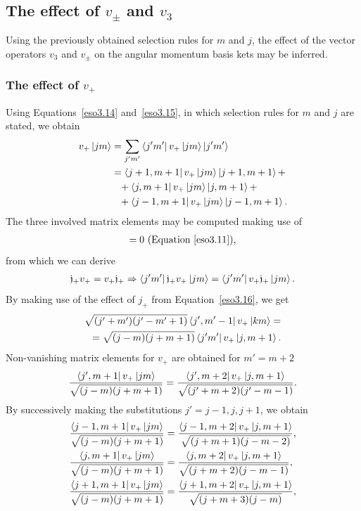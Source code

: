 \documentclass[12pt,a4paper]{report}
\theoremstyle{definition}
\theoremstyle{remark}
\theoremstyle{remark}
\begin{document}
\subsection{The effect of $v_\pm$ and $v_3$}
Using the previously obtained selection rules for $m$ and $j$, the effect of the vector operators $v_3$ and $v_\pm$ on the angular momentum basis kets may be inferred.
\subsubsection{The effect of $v_+$}
Using Equations~\ref{eso3.14} and~\ref{eso3.15}, in which selection rules for $m$ and $j$ are stated, we obtain
\begin{align*}
v_+\ket{jm}&=\sum_{j'm'}\bra{j'm'}v_+\ket{jm}\ket{j'm'}\\
&=\bra{j+1,m+1}v_+\ket{jm}\ket{j+1,m+1}+\\
&\phantom{=}+\bra{j,m+1}v_+\ket{jm}\ket{j,m+1}+\\
&\phantom{=}+\bra{j-1,m+1}v_+\ket{jm}\ket{j-1,m+1}.
\end{align*}
The three involved matrix elements may be computed making use of
\begin{align*}
[\mathfrak{j}_+,v_+]=0 \text{ (Equation~\ref{eso3.11})},
\end{align*}
from which we can derive
\begin{align*}
\mathfrak{j}_+v_+=v_+\mathfrak{j}_+ \Rightarrow \bra{j'm'}\mathfrak{j}_+v_+\ket{jm}=\bra{j'm'}v_+\mathfrak{j}_+\ket{jm}.
\end{align*}
By making use of the effect of $j_+$ from Equation~\ref{eso3.16}, we get
\begin{align*}
\sqrt{(j'+m')(j'-m'+1)}\bra{j',m'-1}v_+\ket{km}=\\
=\sqrt{(j-m)(j+m+1)}\bra{j'm'}v_+\ket{j,m+1}.
\end{align*}
Non-vanishing matrix elements for $v_+$ are obtained for $m'=m+2$
\begin{align*}
\frac{\bra{j',m+1}v_+\ket{jm}}{\sqrt{(j-m)(j+m+1)}}=\frac{\bra{j',m+2}v_+\ket{j,m+1}}{\sqrt{(j'+m+2)(j'-m-1)}}.
\end{align*}
By successively making the substitutions $j'=j-1,j,j+1$, we obtain
\begin{align*}
\frac{\bra{j-1,m+1}v_+\ket{jm}}{\sqrt{(j-m)(j+m+1)}}&=\frac{\bra{j-1,m+2}v_+\ket{j,m+1}}{\sqrt{(j+m+1)(j-m-2)}},\\
\frac{\bra{j,m+1}v_+\ket{jm}}{\sqrt{(j-m)(j+m+1)}}&=\frac{\bra{j,m+2}v_+\ket{j,m+1}}{\sqrt{(j+m+2)(j-m-1)}},\\
\frac{\bra{j+1,m+1}v_+\ket{jm}}{\sqrt{(j-m)(j+m+1)}}&=\frac{\bra{j+1,m+2}v_+\ket{j,m+1}}{\sqrt{(j+m+3)(j-m)}},
\end{align*}
\end{document}
